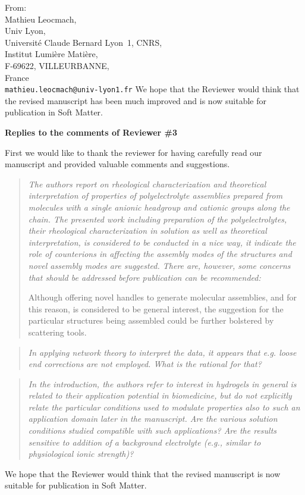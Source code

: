 \documentclass[a4paper, parskip=true, firsthead=false, fromemail=true, foldmarks=false]{scrlttr2}
\newenvironment{quotationi}
{\begin{quotation}\itshape}
{\end{quotation}}
\newcommand{\journal}{Soft Matter}
\begin{document}
\begin{letter}{From:\\
Mathieu Leocmach,\\
Univ Lyon,\\ 
Universit\'e Claude Bernard Lyon~1, CNRS,\\
Institut Lumi\`ere Mati\`ere,\\
F-69622, VILLEURBANNE,\\
France\\
\texttt{mathieu.leocmach@univ-lyon1.fr}
}
We hope that the Reviewer would think that the revised manuscript has been much improved and is now suitable for publication in \journal. 
 
\clearpage

\textsf{\textbf{Replies to the comments of Reviewer \#3}}

First we would like to thank the reviewer for having carefully read our manuscript and provided valuable comments and suggestions.

\begin{quotationi}
The authors report on rheological characterization and theoretical interpretation of properties of polyelectrolyte assemblies prepared from molecules with a single anionic headgroup and cationic groups along the chain. The presented work including preparation of the polyelectrolytes, their rheological characterization in solution as well as theoretical interpretation, is considered to be conducted in a nice way, it indicate the role of counterions in affecting the assembly modes of the structures and novel assembly modes are suggested. There are, however, some concerns that should be addressed before publication can be recommended:

Although offering novel handles to generate molecular assemblies, and for this reason, is considered to be general interest, the suggestion for the particular structures being assembled could be further bolstered by scattering tools.
\end{quotationi}

\begin{quotationi}
In applying network theory to interpret the data, it appears that e.g. loose end corrections are not employed. What is the rational for that?
\end{quotationi}

\begin{quotationi}
In the introduction, the authors refer to interest in hydrogels in general is related to their application potential in biomedicine, but do not explicitly relate the particular conditions used to modulate properties also to such an application domain later in the manuscript. Are the various solution conditions studied compatible with such applications? Are the results sensitive to addition of a background electrolyte (e.g., similar to physiological ionic strength)?

\end{quotationi}



We hope that the Reviewer would think that the revised manuscript is now suitable for publication in \journal. 


\end{letter} 
\end{document}
